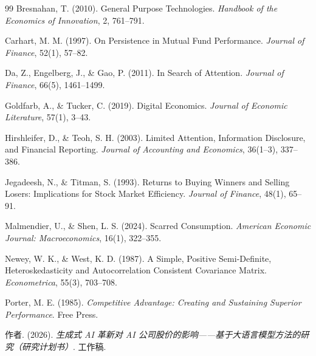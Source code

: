 \documentclass[11pt]{ctexart}
\begin{document}
\begin{thebibliography}{99}
\small
{}
Bresnahan, T. (2010). General Purpose Technologies. \emph{Handbook of the Economics of Innovation}, 2, 761--791.

Carhart, M. M. (1997). On Persistence in Mutual Fund Performance. \emph{Journal of Finance}, 52(1), 57--82.

Da, Z., Engelberg, J., \& Gao, P. (2011). In Search of Attention. \emph{Journal of Finance}, 66(5), 1461--1499.

Goldfarb, A., \& Tucker, C. (2019). Digital Economics. \emph{Journal of Economic Literature}, 57(1), 3--43.

Hirshleifer, D., \& Teoh, S. H. (2003). Limited Attention, Information Disclosure, and Financial Reporting. \emph{Journal of Accounting and Economics}, 36(1--3), 337--386.

Jegadeesh, N., \& Titman, S. (1993). Returns to Buying Winners and Selling Losers: Implications for Stock Market Efficiency. \emph{Journal of Finance}, 48(1), 65--91.

Malmendier, U., \& Shen, L. S. (2024). Scarred Consumption. \emph{American Economic Journal: Macroeconomics}, 16(1), 322--355.

Newey, W. K., \& West, K. D. (1987). A Simple, Positive Semi-Definite, Heteroskedasticity and Autocorrelation Consistent Covariance Matrix. \emph{Econometrica}, 55(3), 703--708.

Porter, M. E. (1985). \emph{Competitive Advantage: Creating and Sustaining Superior Performance}. Free Press.

作者. (2026). \emph{生成式 AI 革新对 AI 公司股价的影响——基于大语言模型方法的研究（研究计划书）}. 工作稿.
\end{thebibliography}
\end{document}
